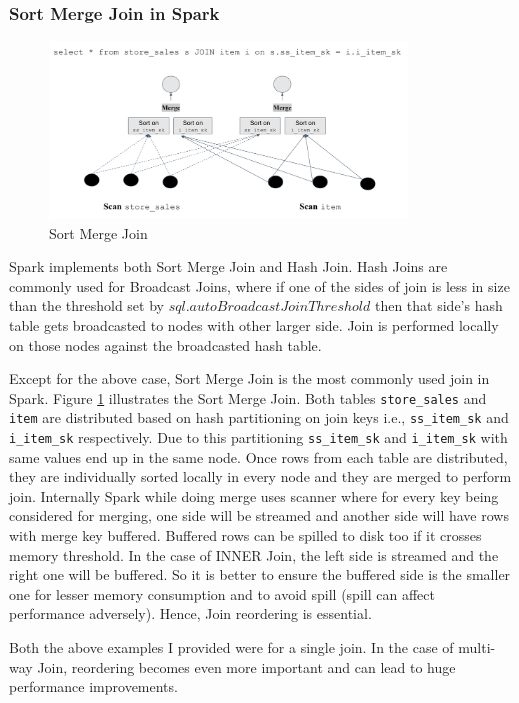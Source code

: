 \subsubsection{Sort Merge Join in Spark}\label{subsubsec:sparkjoin}

\begin{figure}[ht]
\centerline{\includegraphics[width=9.5cm]{fig/SortMergeJoin.png}}
\caption{Sort Merge Join}
\label{sort_merge_join}
\end{figure}

Spark implements both Sort Merge Join and Hash Join.
Hash Joins are commonly used for Broadcast Joins, where if one of the sides of join is less in size than the threshold set by \texttt{$sql.autoBroadcastJoinThreshold$} then that side's hash table gets broadcasted to nodes with other larger side.
Join is performed locally on those nodes against the broadcasted hash table.

Except for the above case, Sort Merge Join is the most commonly used join in Spark. Figure \ref{sort_merge_join} illustrates the Sort Merge Join.
Both tables \texttt{store\_sales} and \texttt{item} are distributed based on hash partitioning on join keys i.e., \texttt{ss\_item\_sk} and \texttt{i\_item\_sk} respectively. Due to this partitioning \texttt{ss\_item\_sk}  and \texttt{i\_item\_sk} with same values end up in the same node. Once rows from each table are distributed, they are individually sorted locally in every node and they are merged to perform join. Internally Spark while doing merge uses scanner where for every key being considered for merging, one side will be streamed and another side will have rows with merge key buffered. Buffered rows can be spilled to disk too if it crosses memory threshold. In the case of INNER Join, the left side is streamed and the right one will be buffered. So it is better to ensure the buffered side is the smaller one for lesser memory consumption and to avoid spill (spill can affect performance adversely). Hence, Join reordering is essential.

Both the above examples I provided were for a single join. In the case of multi-way Join, reordering becomes even more important and can lead to huge performance improvements.